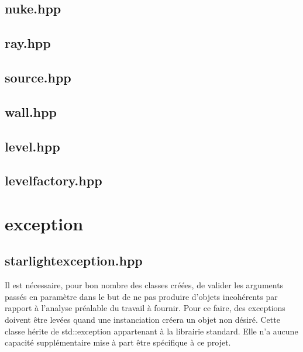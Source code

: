 \documentclass[a4paper,11pt]{report}
\begin{document}
\subsection[Bombe]{nuke.hpp}
\subsection[Rayon]{ray.hpp}
\subsection[Source]{source.hpp}
\subsection[Mur]{wall.hpp}
\subsection[Niveau]{level.hpp}
\subsection[Createur de niveau]{levelfactory.hpp}
\section[L'exception]{exception}
\subsection[Exception Starlight]{starlightexception.hpp}
Il est nécessaire, pour bon nombre des classes créées, de valider les arguments passés en
paramètre dans le but de ne pas produire d'objets incohérents par rapport à
l'analyse préalable du travail à fournir. Pour ce faire, des exceptions doivent
être levées quand une instanciation créera un objet non désiré. 
Cette classe hérite de std::exception appartenant à la librairie standard. Elle n'a aucune
capacité supplémentaire mise à part être spécifique à ce projet. \\ \\
\end{document}
